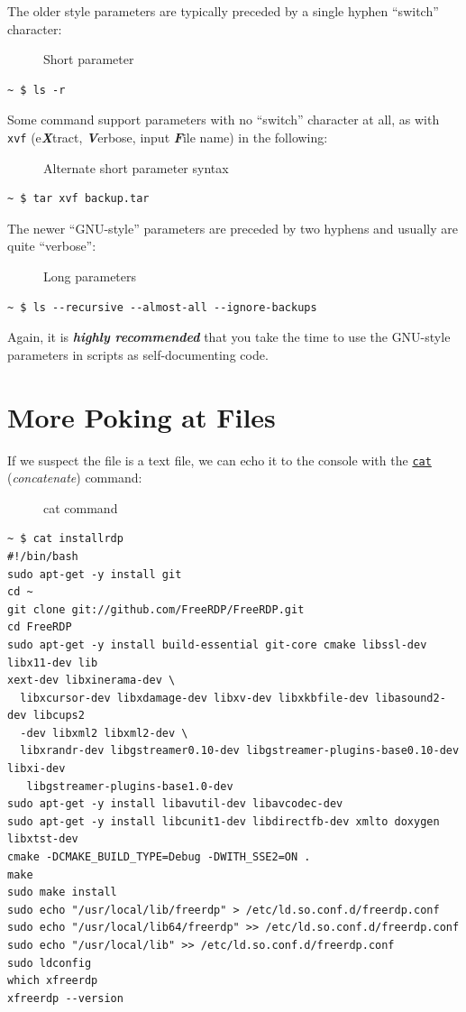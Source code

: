 \documentclass[10pt,]{book}
\numberwithin{figure}{chapter}
\DeclareRobustCommand{\drcap}[1]{\begin{figure}[H]\caption{#1}\end{figure}}
\DeclareRobustCommand{\drcmd}[1]{\index{Commands!#1}}
\begin{document}
The older style parameters are typically preceded by a single hyphen
``switch'' character:

\drcap{Short parameter}

\begin{verbatim}
~ $ ls -r
\end{verbatim}

Some command support parameters with no ``switch'' character at all, as
with \texttt{xvf} (e\textbf{\emph{X}}tract, \textbf{\emph{V}}erbose,
input \textbf{\emph{F}}ile name) in the following:

\drcap{Alternate short parameter syntax}

\begin{verbatim}
~ $ tar xvf backup.tar
\end{verbatim}

The newer ``GNU-style'' parameters are preceded by two hyphens and
usually are quite ``verbose'':

\drcap{Long parameters}

\begin{verbatim}
~ $ ls --recursive --almost-all --ignore-backups
\end{verbatim}

Again, it is \textbf{\emph{highly recommended}} that you take the time
to use the GNU-style parameters in scripts as self-documenting code.

\section{More Poking at Files}\label{more-poking-at-files}

If we suspect the file is a text file, we can echo it to the console
with the \href{http://linux.die.net/man/1/cat}{\texttt{cat}}\drcmd{cat}
(\emph{concatenate}) command:

\drcap{cat command}

\begin{verbatim}
~ $ cat installrdp
#!/bin/bash
sudo apt-get -y install git
cd ~
git clone git://github.com/FreeRDP/FreeRDP.git
cd FreeRDP
sudo apt-get -y install build-essential git-core cmake libssl-dev libx11-dev lib
xext-dev libxinerama-dev \
  libxcursor-dev libxdamage-dev libxv-dev libxkbfile-dev libasound2-dev libcups2
  -dev libxml2 libxml2-dev \
  libxrandr-dev libgstreamer0.10-dev libgstreamer-plugins-base0.10-dev libxi-dev
   libgstreamer-plugins-base1.0-dev
sudo apt-get -y install libavutil-dev libavcodec-dev
sudo apt-get -y install libcunit1-dev libdirectfb-dev xmlto doxygen libxtst-dev
cmake -DCMAKE_BUILD_TYPE=Debug -DWITH_SSE2=ON .
make
sudo make install
sudo echo "/usr/local/lib/freerdp" > /etc/ld.so.conf.d/freerdp.conf
sudo echo "/usr/local/lib64/freerdp" >> /etc/ld.so.conf.d/freerdp.conf
sudo echo "/usr/local/lib" >> /etc/ld.so.conf.d/freerdp.conf
sudo ldconfig
which xfreerdp
xfreerdp --version
\end{verbatim}
\end{document}
